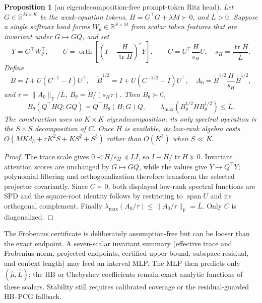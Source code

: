\documentclass[11pt]{article}
\newtheorem{proposition}{Proposition}
\begin{document}
\begin{proposition}[an eigendecomposition-free prompt-token Ritz head]
\label{prop:prompt-nystrom-head}
Let $G\in\mathbb R^{M\times K}$ be the weak-equation tokens,
$H=G^\top G+\lambda M\succ0$, and $\overline L>0$.  Suppose a single softmax
head forms $W_\theta\in\mathbb R^{S\times M}$ from scalar token features that
are invariant under $G\mapsto GQ$, and set
\[
 Y=G^\top W_\theta^\top,
 \qquad
 U=\operatorname{orth}\!\left[
 \left(I-\frac{H}{\operatorname{tr}H}\right)^rY
 \right],
 \qquad
 C=U^\top\frac{H}{s_H}U,
 \quad s_H=\frac{\operatorname{tr}H}{\overline L}.
\]
Define
\[
 \widetilde B=I+U(C^{-1}-I)U^\top,
 \quad
 \widetilde B^{1/2}=I+U(C^{-1/2}-I)U^\top,
 \quad
 A_0=\widetilde B^{1/2}\frac{H}{s_H}\widetilde B^{1/2},
\]
and $\tau=\|A_0\|_{\mathrm F}/\overline L$,
$B_\theta=\widetilde B/(s_H\tau)$.  Then $B_\theta\succ0$,
\[
 B_\theta(Q^\top H Q;GQ)=Q^\top B_\theta(H;G)Q,
 \qquad
 \lambda_{\max}(B_\theta^{1/2}HB_\theta^{1/2})
 \leq\overline L.
\]
The construction uses no $K\times K$ eigendecomposition: its only spectral
operation is the $S\times S$ decomposition of $C$.  Once $H$ is available,
its low-rank algebra costs
$O(MKd_h+rK^2S+KS^2+S^3)$ rather than $O(K^3)$ when $S\ll K$.
\end{proposition}
\begin{proof}
The trace scale gives
$0\prec H/s_H\preceq\overline L I$, so
$I-H/\operatorname{tr}H\succeq0$.  Invariant attention scores are unchanged by
$G\mapsto GQ$, while the values give $Y\mapsto Q^\top Y$; polynomial
filtering and orthogonalization therefore transform the selected projector
covariantly.  Since $C\succ0$, both displayed low-rank spectral functions are
SPD and the square-root identity follows by restricting to
$\operatorname{span}U$ and its orthogonal complement.  Finally
$\lambda_{\max}(A_0/\tau)\leq\|A_0/\tau\|_{\mathrm F}=\overline L$.
Only $C$ is diagonalized.
\end{proof}

The Frobenius certificate is deliberately assumption-free but can be looser
than the exact endpoint.  A seven-scalar invariant summary (effective trace
and Frobenius norm, projected endpoints, certified upper bound, subspace
residual, and context length) may feed an interval MLP.  The MLP then predicts
only $(\widehat\mu,\widehat L)$; the HB or Chebyshev coefficients remain exact
analytic functions of these scalars.  Stability still requires calibrated
coverage or the residual-guarded HB--PCG fallback.
\end{document}
